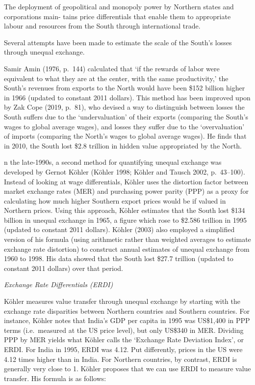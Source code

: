 \documentclass[
]{book}
\begin{document}
The deployment of geopolitical and monopoly power by Northern states and corporations main-
tains price differentials that enable them to appropriate labour and resources from the South
through international trade.

Several attempts have been made to estimate the scale of the South's losses through unequal
exchange.

Samir Amin (1976, p.~144) calculated that `if the rewards of labor were equivalent to
what they are at the center, with the same productivity,' the South's revenues from exports to the
North would have been \$152 billion higher in 1966 (updated to constant 2011 dollars). This
method has been improved upon by Zak Cope (2019, p.~81), who devised a way to distinguish
between losses the South suffers due to the `undervaluation' of their exports (comparing the
South's wages to global average wages), and losses they suffer due to the `overvaluation' of
imports (comparing the North's wages to global average wages). He finds that in 2010, the South
lost \$2.8 trillion in hidden value appropriated by the North.

n the late-1990s, a second method for quantifying unequal exchange was developed by Gernot
Köhler (Köhler 1998; Köhler and Tausch 2002, p.~43--100). Instead of looking at wage differentials,
Köhler uses the distortion factor between market exchange rates (MER) and purchasing power
parity (PPP) as a proxy for calculating how much higher Southern export prices would be if
valued in Northern prices. Using this approach, Köhler estimates that the South lost \$134 billion
in unequal exchange in 1965, a figure which rose to \$2.586 trillion in 1995 (updated to constant
2011 dollars). Köhler (2003) also employed a simplified version of his formula (using arithmetic
rather than weighted averages to estimate exchange rate distortion) to construct annual estimates
of unequal exchange from 1960 to 1998. His data showed that the South lost \$27.7 trillion (updated
to constant 2011 dollars) over that period.

\emph{Exchange Rate Differentials (ERDI)}

Köhler measures value transfer through unequal exchange by starting with the exchange rate
disparities between Northern countries and Southern countries. For instance, Köhler notes that
India's GDP per capita in 1995 was US\$1,400 in PPP terms (i.e.~measured at the US price level),
but only US\$340 in MER. Dividing PPP by MER yields what Köhler calls the `Exchange Rate Deviation
Index', or ERDI. For India in 1995, ERDI was 4.12. Put differently, prices in the US were 4.12 times
higher than in India. For Northern countries, by contrast, ERDI is generally very close to 1. Köhler proposes that we can use ERDI to measure value transfer. His formula is as follows:
\end{document}
